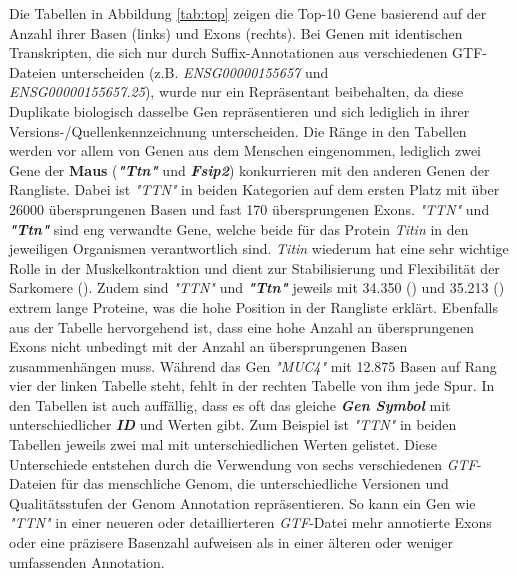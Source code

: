 \documentclass[12pt]{article}
\begin{document}
Die Tabellen in Abbildung \ref{tab:top} zeigen die Top-10 Gene basierend auf der Anzahl ihrer Basen (links) und Exons (rechts).
Bei Genen mit identischen Transkripten, die sich nur durch Suffix-Annotationen aus verschiedenen GTF-Dateien unterscheiden
(z.B. \textit{ENSG00000155657}  und \\ \textit{ENSG00000155657.25}), wurde nur ein Repräsentant beibehalten,
da diese Duplikate biologisch dasselbe Gen repräsentieren und sich lediglich in ihrer
Versions-/Quellenkennzeichnung unterscheiden.
Die Ränge in den Tabellen werden vor allem von Genen aus dem Menschen eingenommen, lediglich zwei Gene der \textbf{Maus} (\textbf{\textit{"Ttn"}} und \textbf{\textit{Fsip2}}) konkurrieren mit den
anderen Genen der Rangliste. Dabei ist \textit{"TTN"} in beiden Kategorien auf dem ersten Platz mit 
über 26000 übersprungenen Basen und fast 170 übersprungenen Exons. \textit{"TTN"} und \textbf{\textit{"Ttn"}} 
sind eng verwandte Gene, welche beide für das Protein \textit{Titin} in den
jeweiligen Organismen verantwortlich sind. \textit{Titin} wiederum hat eine sehr wichtige Rolle in der
Muskelkontraktion und dient zur Stabilisierung und Flexibilität der Sarkomere (\cite{uniprot_titin}). Zudem
sind \textit{"TTN"} und \textbf{\textit{"Ttn"}} jeweils mit 34.350 (\cite{uniprot_TTN}) und 35.213 (\cite{uniprot_Ttn}) extrem lange Proteine,
was die hohe Position in der Rangliste erklärt.
Ebenfalls aus der Tabelle hervorgehend ist, dass eine hohe Anzahl an übersprungenen Exons nicht unbedingt mit
der Anzahl an übersprungenen Basen zusammenhängen muss. Während das Gen \textit{"MUC4"} mit 
12.875 Basen auf Rang vier der linken Tabelle steht, fehlt in der rechten Tabelle von ihm jede Spur.
In den Tabellen ist auch auffällig, dass es oft das gleiche \textbf{\textit{Gen Symbol}} mit unterschiedlicher 
\textit{\textbf{ID}} und Werten gibt. Zum Beispiel ist \textit{"TTN"} in beiden Tabellen jeweils zwei mal
mit unterschiedlichen Werten gelistet. 
Diese Unterschiede entstehen durch die Verwendung von sechs verschiedenen \textit{GTF}-Dateien für das menschliche Genom, 
die unterschiedliche Versionen und Qualitätsstufen der Genom Annotation repräsentieren. So kann ein Gen wie \textit{"TTN"} 
in einer neueren oder detaillierteren \textit{GTF}-Datei mehr annotierte Exons oder eine präzisere Basenzahl aufweisen als 
in einer älteren oder weniger umfassenden Annotation. 













\printbibliography


\newpage~\appendix
\end{document}
